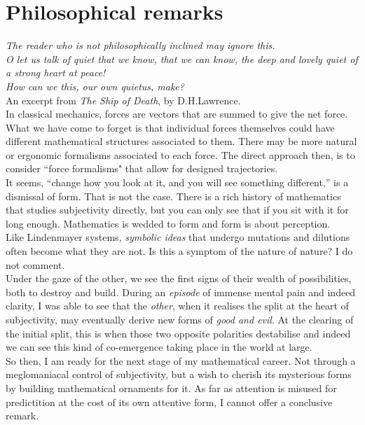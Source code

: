 \section{Philosophical remarks}

\textit{The reader who is not philosophically inclined may ignore this.}
\\

\textit{O let us talk of quiet that we know,
that we can know, the deep and lovely quiet
of a strong heart at peace!}
\\
\textit{How can we this, our own quietus, make?}
\\
An excerpt from \textit{The Ship of Death}, by D.H.Lawrence.
\\

In classical mechanics, forces are vectors that 
are summed to give the net force. What we have 
come to forget is that individual forces themselves
could have different mathematical structures associated 
to them. There may be more natural or ergonomic 
formalisms associated to each force. 
The direct approach then, is to consider 
``force formalisms" that allow for designed trajectories.
\\

It seems, ``change how you look at it, and you will see something 
different,'' is a dismissal of form. That is not the case. 
There is a rich history of mathematics that studies 
subjectivity directly, but you can only see that if you sit with 
it for long enough. Mathematics is wedded to form and form 
is about perception.
\\

Like Lindenmayer systems, \textit{symbolic ideas} that undergo mutations
and dilutions often become what they are not. Is this a symptom 
of the nature of nature? I do not comment.
\\

Under the gaze of the other, we see the first signs 
of their wealth of possibilities, both to destroy and build.
During an \textit{episode} of immense mental pain and indeed 
clarity, I was able to see that the \textit{other}, when 
it realises the split at the heart of subjectivity, 
may eventually derive new forms of \textit{good and evil}. 
At the clearing of the initial split, 
this is when those two opposite polarities destabilise and indeed
we can see this kind of co-emergence taking place 
in the world at large.
\\

So then, I am ready for the next stage of my mathematical career. 
Not through a meglomaniacal control of subjectivity, 
but a wish to cherish its mysterious forms by 
building mathematical ornaments for it. As far 
as attention is misused for predictition at the cost 
of its own attentive form, I cannot offer a conclusive remark.
\\

